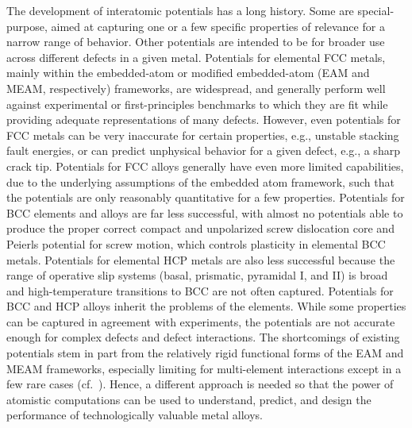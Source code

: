 \documentclass{article}
\begin{document}
The development of interatomic potentials has a long history.
Some are special-purpose, aimed at capturing one or a few specific properties of relevance for a narrow range of behavior.
Other potentials are intended to be for broader use across different defects in a given metal.
Potentials for elemental FCC metals, mainly within the embedded-atom or modified embedded-atom (EAM and MEAM, respectively) frameworks, are widespread, and generally perform well against experimental or first-principles benchmarks to which they are fit while providing adequate representations of many defects.
However, even potentials for FCC metals can be very inaccurate for certain properties, e.g., unstable stacking fault energies, or can predict unphysical behavior for a given defect, e.g., a sharp crack tip.
Potentials for FCC alloys generally have even more limited capabilities, due to the underlying assumptions of the embedded atom framework, such that the potentials are only reasonably quantitative for a few properties.
Potentials for BCC elements and alloys are far less successful, with almost no potentials able to produce the proper correct compact and unpolarized screw dislocation core and Peierls potential for screw motion, which controls plasticity in elemental BCC metals.
Potentials for elemental HCP metals are also less successful because the range of operative slip systems (basal, prismatic, pyramidal I, and II) is broad and high-temperature transitions to BCC are not often captured.
Potentials for BCC and HCP alloys inherit the problems of the elements.
While some properties can be captured in agreement with experiments, the potentials are not accurate enough for complex defects and defect interactions.
The shortcomings of existing potentials stem in part from the relatively rigid functional forms of the EAM and MEAM frameworks, especially limiting for multi-element interactions except in a few rare cases (cf.~\cite{Juslin2005AnalyticalSystem}).
Hence, a different approach is needed so that the power of atomistic computations can be used to understand, predict, and design the performance of technologically valuable metal alloys.
\end{document}
